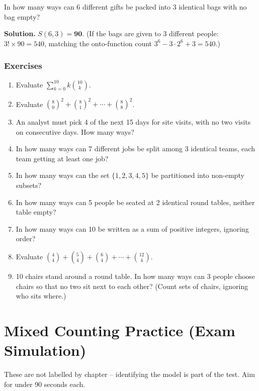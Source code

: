 \documentclass[11pt,a4paper,openany]{report}
\newenvironment{exercises}{\subsection*{Exercises \thechapter}\begin{enumerate}[label=\textbf{\thechapter.\arabic*},leftmargin=3.2em]}{\end{enumerate}}
\newcommand{\C}[2]{\binom{#1}{#2}}
\begin{document}
\begin{example}
In how many ways can 6 different gifts be packed into 3 identical bags with no bag empty?

\textbf{Solution.} $S(6,3)=\mathbf{90}$. (If the bags are given to 3 different people: $3!\times90=540$, matching
the onto-function count $3^6-3\cdot2^6+3=540$.)
\end{example}

\begin{exercises}
\item Evaluate $\sum_{k=0}^{10}k\C{10}k$.
\item Evaluate $\C80^2+\C81^2+\cdots+\C88^2$.
\item An analyst must pick 4 of the next 15 days for site visits, with no two visits on consecutive days. How many ways?
\item In how many ways can 7 different jobs be split among 3 identical teams, each team getting at least one job?
\item In how many ways can the set $\{1,2,3,4,5\}$ be partitioned into non-empty subsets?
\item In how many ways can 5 people be seated at 2 identical round tables, neither table empty?
\item In how many ways can 10 be written as a sum of positive integers, ignoring order?
\item Evaluate $\C44+\C54+\C64+\cdots+\C{12}4$.
\item 10 chairs stand around a round table. In how many ways can 3 people choose chairs so that no two sit next to each other? (Count sets of chairs, ignoring who sits where.)
\end{exercises}

\chapter{Mixed Counting Practice (Exam Simulation)}\label{ch:mixcount}
These are not labelled by chapter -- identifying the model is part of the test. Aim for under
90 seconds each.
\end{document}
